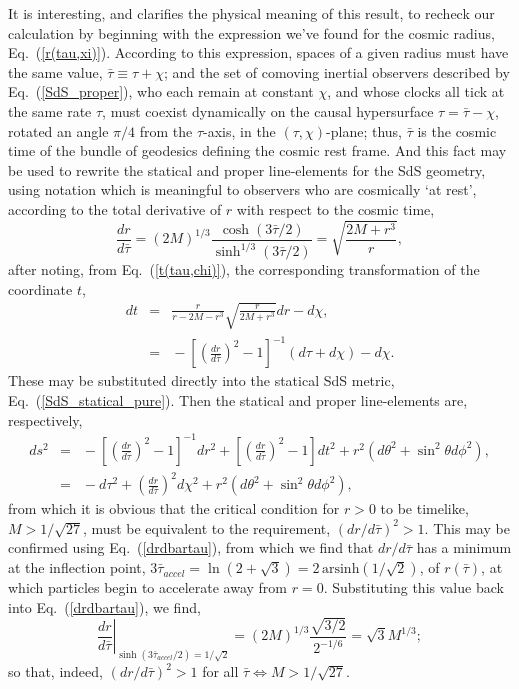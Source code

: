 It is interesting, and clarifies the physical meaning of this result, to recheck our calculation by beginning with the expression we've found for the cosmic radius, Eq.~(\ref{r(tau,xi)}). According to this expression, spaces of a given radius must have the same value, $\bar\tau\equiv\tau+\chi$; and the set of comoving inertial observers described by Eq.~(\ref{SdS_proper}), who each remain at constant $\chi$, and whose clocks all tick at the same rate $\tau$, must coexist dynamically on the causal hypersurface $\tau=\bar\tau-\chi$, rotated an angle $\pi/4$ from the $\tau$-axis, in the $(\tau,\chi)$-plane; thus, $\bar\tau$ is the cosmic time of the bundle of geodesics defining the cosmic rest frame. And this fact may be used to rewrite the statical and proper line-elements for the SdS geometry, using notation which is meaningful to observers who are cosmically `at rest', according to the total derivative of $r$ with respect to the cosmic time,
\begin{equation}
\frac{dr}{d\bar\tau}=\left(2M\right)^{1/3}\frac{\cosh\left(3\bar\tau/2\right)}{\sinh^{1/3}\left(3\bar\tau/2\right)}=\sqrt{\frac{2M+r^3}{r}},\label{drdbartau}
\end{equation}
after noting, from Eq.~(\ref{t(tau,chi)}), the corresponding transformation of the coordinate $t$,
\begin{eqnarray}
dt\!\!\!&=&\!\!\!\nonumber{\frac{r}{r-2M-r^3}\sqrt{\frac{r}{2M+r^3}}dr-d\chi},\\
\!\!\!&=&\!\!\!-\left[\left(\frac{dr}{d\bar\tau}\right)^2-1\right]^{-1}(d\tau+d\chi)-d\chi.
\end{eqnarray}
These may be substituted directly into the statical SdS metric, Eq.~(\ref{SdS_statical_pure}). Then the statical and proper line-elements are, respectively,
\begin{eqnarray}
ds^2\!\!\!&=&\!\!\!-\left[\left(\frac{dr}{d\bar\tau}\right)^2-1\right]^{-1}dr^2+\left[\left(\frac{dr}{d\bar\tau}\right)^2-1\right]dt^2+r^2\left(d\theta^2+\sin^2\theta{d\phi^2}\right),\label{SdS_statical_bartau}\\
\!\!\!&=&\!\!\!-d\tau^2+\left(\frac{dr}{d\bar\tau}\right)^2d\chi^2+r^2\left(d\theta^2+\sin^2\theta{d\phi^2}\right),\label{SdS_proper_bartau}
\end{eqnarray}
from which it is obvious that the critical condition for $r>0$ to be timelike, $M>1/\sqrt{27}$, must be equivalent to the requirement, $(dr/d\bar\tau)^2>1$. This may be confirmed using Eq.~(\ref{drdbartau}), from which we find that $dr/d\bar\tau$ has a minimum at the inflection point, $3\bar\tau_{accel}=\ln\left(2+\sqrt{3}\right)=2\,\mathrm{arsinh}\left(1/\sqrt{2}\right)$, of $r(\bar\tau)$, at which particles begin to accelerate away from $r=0$. Substituting this value back into Eq.~(\ref{drdbartau}), we find, 
\begin{equation}
{\left.\frac{dr}{d\bar\tau}\right|}_{\sinh\left(3\bar\tau_{accel}/2\right)=1/\sqrt{2}}=\left(2M\right)^{1/3}\frac{\sqrt{3/2}}{2^{-1/6}}=\sqrt{3}M^{1/3};\label{rdot_crit}
\end{equation}
so that, indeed, $(dr/d\bar\tau)^2>1$ for all $\bar\tau\Leftrightarrow{M}>1/\sqrt{27}$.

